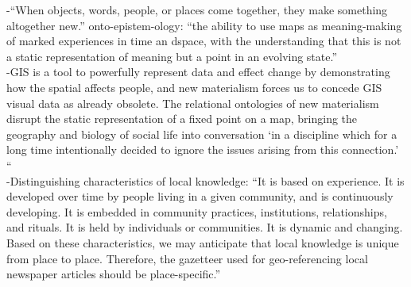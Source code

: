-{\color{orange}“When objects, words, people, or places come together, they make something altogether new.” onto-epistem-ology: “the ability to use maps as meaning-making of marked experiences in time an dspace, with the understanding that this is not a static representation of meaning but a point in an evolving state.”\cite{McQueenBaker2019}}\\
-{\color{orange}GIS is a tool to powerfully represent data and effect change by demonstrating how the spatial affects people, and new materialism forces us to concede GIS visual data as already obsolete. The relational ontologies of new materialism disrupt the static representation of a fixed point on a map, bringing the geography and biology of social life into conversation ‘in a discipline which for a long time intentionally decided to ignore the issues arising from this connection.’ “\cite{McQueenBaker2019}}\\
-{\color{orange}Distinguishing characteristics of local knowledge: “It is based on experience. It is developed over time by people living in a given community, and is continuously developing. It is embedded in community practices, institutions, relationships, and rituals. It is held by individuals or communities. It is dynamic and changing. Based on these characteristics, we may anticipate that local knowledge is unique from place to place. Therefore, the gazetteer used for geo-referencing local newspaper articles should be place-specific.”\cite{Cai2016}}\\


